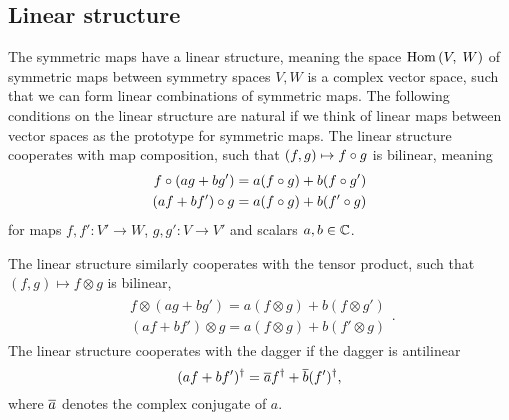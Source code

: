 
\subsection{Linear structure}
\label{subsec:nonablian:basics:linear_structure}

The symmetric maps have a linear structure, meaning the space $\mathrm{Hom}\left(V,\; W\right)$ of symmetric maps between symmetry spaces $V, W$ is a complex vector space, such that we can form linear combinations of symmetric maps.
%
The following conditions on the linear structure are natural if we think of linear maps between vector spaces as the prototype for symmetric maps.
%
The linear structure cooperates with map composition, such that $(f, g) \mapsto f \circ g$ is bilinear, meaning
\begin{align}
    \label{eq:nonabelian:basics:linear_structure_compatible_with_compose}
    \begin{split}
        f \circ (ag + bg') = a (f \circ g) + b(f \circ g')
        \\
        (af + bf') \circ g = a (f \circ g) + b(f' \circ g)
    \end{split}
\end{align}
for maps $f, f' : V' \to W$, $g, g': V \to V'$ and scalars $a, b \in \mathbb{C}$.

The linear structure similarly cooperates with the tensor product, such that $(f, g) \mapsto f \otimes g$ is bilinear,
\begin{align}
    \label{eq:nonabelian:basics:linear_structure_compatible_with_otimes}
    \begin{split}
        f \otimes (ag + bg') = a (f \otimes g) + b(f \otimes g')
        \\
        (af + bf') \otimes g = a (f \otimes g) + b(f' \otimes g)
    \end{split}
    .
\end{align}
%
The linear structure cooperates with the dagger if the dagger is antilinear
\begin{equation}
    \label{eq:nonabelian:basics:linear_structure_compatible_with_dagger}
    (a f + b f')^\dagger = \overline{a} f^\dagger + \overline{b} (f')^\dagger
    ,
\end{equation}
where $\overline{a}$ denotes the complex conjugate of $a$.

